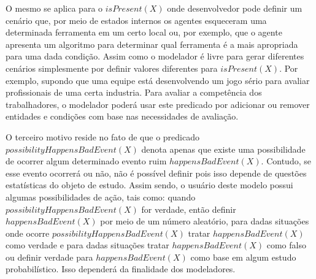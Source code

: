 O mesmo se aplica para o $isPresent(X)$ onde desenvolvedor pode definir um cenário que, por meio de estados internos os agentes esqueceram uma determinada ferramenta em um certo local ou, por exemplo, que o agente apresenta um algoritmo para determinar qual ferramenta é a mais apropriada para uma dada condição. Assim como o modelador é livre para gerar diferentes cenários simplesmente por definir valores diferentes para $isPresent(X)$. Por exemplo, supondo que uma equipe está desenvolvendo um jogo sério para avaliar profissionais de uma certa industria. Para avaliar a competência dos trabalhadores, o modelador poderá usar este predicado por adicionar ou remover entidades e condições com base nas necessidades de avaliação.

O terceiro motivo reside no fato de que o predicado $possibilityHappensBadEvent(X)$ denota apenas que existe uma possibilidade de ocorrer algum determinado evento ruim  $happensBadEvent(X)$. Contudo, se esse evento ocorrerá ou não, não é possível definir pois isso depende de questões estatísticas do objeto de estudo. Assim sendo, o usuário deste modelo possui algumas possibilidades de ação, tais como: quando $possibilityHappensBadEvent(X)$  for verdade, então definir $happensBadEvent(X)$ por meio de um número aleatório, para dadas situações onde ocorre $possibilityHappensBadEvent(X)$ tratar $happensBadEvent(X)$ como verdade e para dadas situações tratar $happensBadEvent(X)$ como falso ou definir verdade para $happensBadEvent(X)$ como base em algum estudo probabilístico. Isso dependerá da finalidade dos modeladores. 